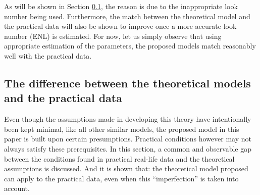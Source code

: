 \documentclass[journal]{IEEEtran}
\begin{document}
As will be shown in Section \ref{sec:improve_the_match_bw_theory_practice}, 
  the reason is due to the inappropriate look number being used.
Furthermore, the match between the theoretical model and the practical data will also be shown to improve once a more accurate look number (ENL) is estimated.  
For now, let us simply observe that
  using appropriate estimation of the parameters, 
  the proposed models match reasonably well with the practical data.

\subsection{The difference between the theoretical models and the practical data}  
\label{sec:improve_the_match_bw_theory_practice}

Even though the assumptions made in developing this theory have intentionally been kept minimal, 
  like all other similar models, the proposed model in this paper is built upon certain presumptions.
Practical conditions however may not always satisfy these prerequisites.
In this section, a common and observable gap between the conditions found in practical real-life data and the theoretical assumptions is discussed.
And it is shown that: the theoretical model proposed can apply to the practical data, even when this ``imperfection'' is taken into account.
\end{document}
